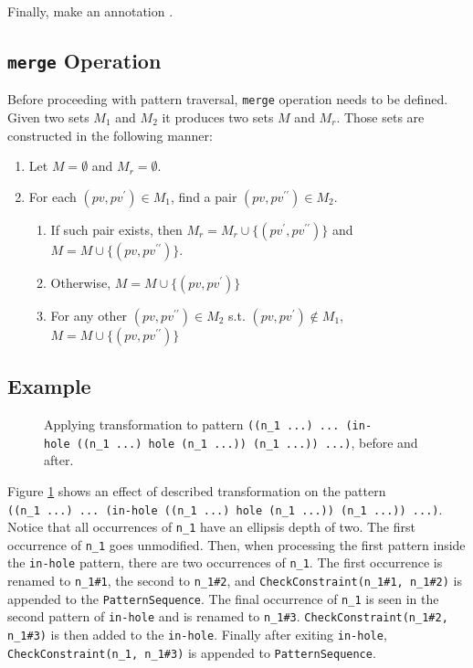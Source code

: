 Finally, make an annotation .

\subsection{\texttt{merge} Operation}
Before proceeding with pattern traversal, \texttt{merge} operation needs to be defined. Given two sets $M_1$ and $M_2$ it produces two sets $M$ and $M_r$. Those sets are constructed in the following manner:

\begin{enumerate}
\item Let $M=\emptyset$ and $M_r=\emptyset$.
\item For each $(pv, pv^{\prime}) \in M_1$, find a pair $(pv, pv^{\prime\prime}) \in M_2$.
\begin{enumerate}
\item If such pair exists, then $M_r=M_r \cup \{(pv^{\prime},  pv^{\prime\prime})\}$ and $M=M \cup \{(pv,  pv^{\prime\prime})\}$.
\item Otherwise, $M=M \cup \{(pv,  pv^{\prime})\}$
\item For any other $(pv, pv^{\prime\prime}) \in M_2$ s.t.  $(pv, pv^{\prime}) \notin M_1$, $M=M \cup \{(pv,  pv^{\prime\prime})\}$
\end{enumerate}
\end{enumerate}

\subsection{Example}

\begin{figure}[htp]
	\centering
\caption{Applying transformation to pattern \texttt{((n\_1\ ...)\ ...\ (in-hole\ ((n\_1\ ...)\ hole\ (n\_1\ ...))\ (n\_1\ ...))\ ...)}, before and after.}
\label{transformation-pattern-constraintcheck}
\end{figure}

Figure \ref{transformation-pattern-constraintcheck} shows an effect of described transformation on the pattern \texttt{((n\_1\ ...)\ ...\ (in-hole\ ((n\_1\ ...)\ hole\ (n\_1\ ...))\ (n\_1\ ...))\ ...)}. Notice that all occurrences of \texttt{n\_1} have an ellipsis depth of two. The first occurrence of \texttt{n\_1} goes unmodified. Then, when processing the first pattern inside the \texttt{in-hole} pattern, there are two occurrences of \texttt{n\_1}. The first occurrence is renamed to \texttt{n\_1\#1}, the second to \texttt{n\_1\#2}, and \texttt{CheckConstraint(n\_1\#1, n\_1\#2)} is appended to the \texttt{PatternSequence}. The final occurrence of \texttt{n\_1} is seen in the second pattern of \texttt{in-hole} and is renamed to \texttt{n\_1\#3}. \texttt{CheckConstraint(n\_1\#2, n\_1\#3)} is then added to the \texttt{in-hole}. Finally after exiting \texttt{in-hole}, \texttt{CheckConstraint(n\_1, n\_1\#3)} is appended to \texttt{PatternSequence}.

